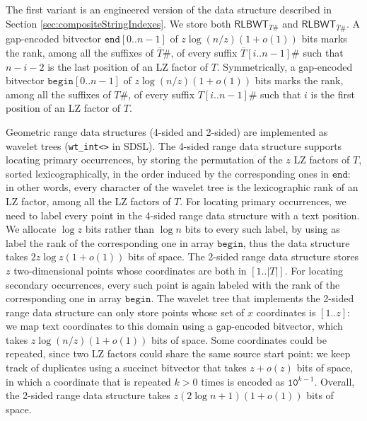 \documentclass[a4paper,UKenglish]{lipics-v2016}
\newcommand{\REV}[1]{\ensuremath{\overline{#1}}}
\newcommand{\RLBWT}{\ensuremath{\mathsf{RLBWT}}}
\begin{document}
The first variant is an engineered version of the data structure described in Section \ref{sec:compositeStringIndexes}. We store both $\RLBWT_{T\#}$ and $\RLBWT_{\REV{T}\#}$. A gap-encoded bitvector $\mathtt{end}[0..n-1]$ of $z\log(n/z)(1+o(1))$ bits marks the rank, among all the suffixes of $\REV{T}\#$, of every suffix $\REV{T}[i..n-1]\#$ such that $n-i-2$ is the last position of an LZ factor of $T$. Symmetrically, a gap-encoded bitvector $\mathtt{begin}[0..n-1]$ of $z\log(n/z)(1+o(1))$ bits marks the rank, among all the suffixes of $T\#$, of every suffix $T[i..n-1]\#$ such that $i$ is the first position of an LZ factor of $T$. 

Geometric range data structures (4-sided and 2-sided) are implemented as wavelet trees (\texttt{wt\_int<>} in SDSL). The 4-sided range data structure supports locating primary occurrences, by storing the permutation of the $z$ LZ factors of $T$, sorted lexicographically, in the order induced by the corresponding ones in $\mathtt{end}$: in other words, every character of the wavelet tree is the lexicographic rank of an LZ factor, among all the LZ factors of $T$. For locating primary occurrences, we need to label every point in the 4-sided range data structure with a text position. We allocate $\log{z}$ bits rather than $\log{n}$ bits to every such label, by using as label the rank of the corresponding one in array $\mathtt{begin}$, thus the data structure takes $2z\log{z}(1+o(1))$ bits of space. The 2-sided range data structure stores $z$ two-dimensional points whose coordinates are both in $[1..|T|]$. For locating secondary occurrences, every such point is again labeled with the rank of the corresponding one in array $\mathtt{begin}$. The wavelet tree that implements the 2-sided range data structure can only store points whose set of $x$ coordinates is $[1..z]$: we map text coordinates to this domain using a gap-encoded bitvector, which takes $z\log(n/z)(1+o(1))$ bits of space. Some coordinates could be repeated, since two LZ factors could share the same source start point: we keep track of duplicates using a succinct bitvector that takes $z+o(z)$ bits of space, in which a coordinate that is repeated $k>0$ times is encoded as $\mathtt{10}^{k-1}$. Overall, the 2-sided range data structure takes $z(2\log n + 1)(1+o(1))$ bits of space.
\end{document}
